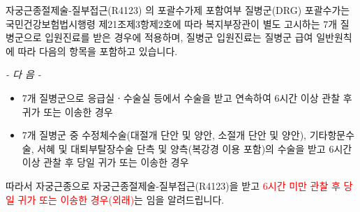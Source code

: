 \begin{commentbox}{자궁근종절제술-질부접근(R4123) 의 포괄수가제 포함여부}
질병군(DRG) 포괄수가는 국민건강보험법시행령 제21조제3항제2호에 따라 복지부장관이 별도 고시하는 7개 질병군으로 입원진료를 받은 경우에 적용하며, 질병군 입원진료는 질병군 급여 일반원칙에 따라 다음의 항목을 포함하고 있습니다.\par
\begin{center}\emph{- 다 음 -}\end{center}
\begin{itemize}\tightlist
\item 7개 질병군으로 응급실ㆍ수술실 등에서 수술을 받고 연속하여 6시간 이상 관찰 후 귀가 또는 이송한 경우 
\item 7개 질병군 중 수정체수술(대절개 단안 및 양안, 소절개 단안 및 양안), 기타항문수술, 서혜 및 대퇴부탈장수술 단측 및 양측(복강경 이용 포함)의 수술을 받고 6시간 이상 관찰 후 당일 귀가 또는 이송한 경우
\end{itemize}
따라서 자궁근종으로 자궁근종절제술-질부접근(R4123)을 받고 \textcolor{red}{6시간 미만 관찰 후 당일 귀가 또는 이송한 경우(외래)}는 임을 알려드립니다.
\end{commentbox}
\prezi{\clearpage}
\par
\medskip
{}
\prezi{\clearpage}
\par
\medskip
{}
\prezi{\clearpage}
\par
\medskip
{}
\clearpage

